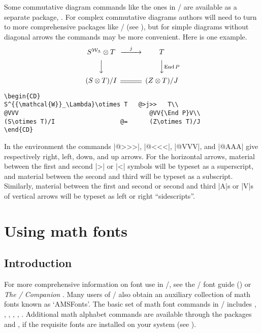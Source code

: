 \documentclass[leqno,titlepage,openany]{amsldoc}
\newcommand{\booktitle}[1]{\textit{#1}}
\DeclareMathOperator{\End}{End}
\begin{document}
Some commutative diagram commands like the ones in \amstex/ are
available as a separate package, . For complex commutative
diagrams authors will need to turn to more comprehensive packages like
\xypic/ (see ), but for simple diagrams without diagonal
arrows the  commands
may be more convenient. Here is one example.
\begin{equation*}
\begin{CD}
S^{{\mathcal{W}}_\Lambda}\otimes T   @>j>>   T\\
@VVV                                    @VV{\End P}V\\
(S\otimes T)/I                  @=      (Z\otimes T)/J
\end{CD}
\end{equation*}
\begin{verbatim}
\begin{CD}
S^{{\mathcal{W}}_\Lambda}\otimes T   @>j>>   T\\
@VVV                                    @VV{\End P}V\\
(S\otimes T)/I                  @=      (Z\otimes T)/J
\end{CD}
\end{verbatim}
In the  environment the commands |@>>>|,
|@<<<|, |@VVV|, and |@AAA| give respectively right, left, down, and up
arrows. For the horizontal arrows, material between the first and second
|>| or |<| symbols will be typeset as a superscript, and material
between the second and third will be typeset as a subscript. Similarly,
material between the first and second or second and third |A|s or |V|s
of vertical arrows will be typeset as left or right ``sidescripts''.

\chapter{Using math fonts}

\section{Introduction}

For more comprehensive information on font use in \latex/, see the
\latex/ font guide () or \booktitle{The \latex/
Companion} \cite{tlc}. Many users of \amslatex/ also obtain an auxiliary
collection of math fonts known as `AMSFonts'.
The basic set of math font commands\relax {} in \latex/ includes , ,
, , , . Additional math
alphabet commands are available through the packages  and
, if the requisite fonts are installed on your system (see
).
\end{document}
